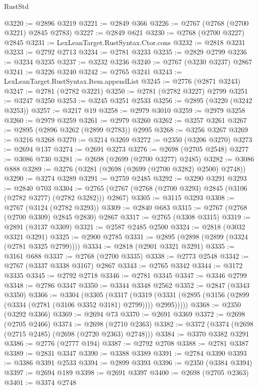 \begin{lexlean}{RustStd}
\begin{coremodule}
@3220 := @2896 @3219
@3221 := @2849 @366
@3226 := @2767 (@2768 (@2700 @3221) @2845 @2783)
@3227 := @2849 @621
@3230 := @2768 (@2700 @3227) @2845
@3231 := LexLeanTarget.RustSyntax.Ctor.cons
@3232 := @2818 @3231
@3233 := @2792 @2713
@3234 := @2781 @3233
@3235 := @2829 @2799
@3236 := @3234 @3235
@3237 := @3232 @3236
@3240 := @2767 (@3230 @3237) @2867
@3241 := @3226 @3240
@3242 := @2765 @3241
@3243 := LexLeanTarget.RustSyntax.Item.appendList
@3245 := @2776 (@2871 @3243)
@3247 := @2781 (@2782 @3221)
@3250 := @2781 (@2782 @3227) @2799
@3251 := @3247 @3250
@3253 := @3245 @3251 @2533
@3256 := @2895 (@3220 (@3242 @3253))
@3257 := @3217 @19
@3258 := @2979 @3010
@3259 := @2979 @3258
@3260 := @2979 @3259
@3261 := @2979 @3260
@3262 := @3257 @3261
@3267 := @2895 (@2896 @3262 (@2899 @2783)) @2995
@3268 := @3256 @3267
@3269 := @3216 @3268
@3270 := @3214 @3269
@3272 := @2350 (@3206 @3270)
@3273 := @2694 @137
@3274 := @2691 @3273
@3276 := @2698 (@2705 @2548)
@3277 := @3086 @730
@3281 := @2698 (@2699 (@2700 @3277) @2485)
@3282 := @3086 @888
@3289 := @3276 (@3281 (@2698 (@2699 (@2700 @3282) @2500) @2748))
@3290 := @3274 @3289
@3291 := @2759 @2485
@3292 := @3290 @3291
@3293 := @2840 @703
@3304 := @2765 (@2767 (@2768 (@2700 @3293) @2845 (@3106 (@2782 @3277) (@2782 @3282))) @2867)
@3305 := @3115 @3293
@3308 := @2767 (@3124 (@2782 @3293))
@3309 := @2840 @683
@3315 := @2767 (@2768 (@2700 @3309) @2845 @2830) @2867
@3317 := @2765 (@3308 @3315)
@3319 := @2891 (@3137 @3309)
@3321 := @2587 @2485 @2500
@3324 := @2818 (@3032 @3321 @3291)
@3325 := @2900 @2785
@3331 := @2895 (@2898 (@2899 (@3324 (@2781 @3325 @2799))))
@3334 := @2818 (@2901 @3321 @3291)
@3335 := @3161 @688
@3337 := @2768 (@2700 @3335)
@3338 := @2773 @2548
@3342 := @2767 (@3337 @3338 @3167) @2867
@3343 := @2765 @3342
@3344 := @3172 @3335
@3345 := @2792 @2718
@3346 := @2781 @3345
@3347 := @3346 @2799
@3348 := @2786 @3347
@3350 := @3344 @3348 @2562
@3352 := @2847 (@3343 @3350)
@3366 := @3304
    (@3305
      (@3317
        (@3319 (@3331 (@2895 (@3156 (@2899 (@3334 (@2781 (@3106 @3352 @3181) @2799)))) @2995)))))
@3368 := @2350 (@3292 @3366)
@3369 := @2694 @73
@3370 := @2691 @3369
@3372 := @2698 (@2705 @2466)
@3374 := @2698 (@2710 @2363)
@3382 := @3372 (@3374 (@2698 (@2715 @2485) (@2698 (@2720 @2363) @2748)))
@3384 := @3370 @3382 @3291
@3386 := @2776 (@2777 @194)
@3387 := @2792 @2708
@3388 := @2781 @3387
@3389 := @2831 @3347
@3390 := @3388 @3389
@3391 := @2784 @3390
@3393 := @3386 @3391 @2533
@3394 := @2899 @3393
@3396 := @2350 (@3384 @3394)
@3397 := @2694 @189
@3398 := @2691 @3397
@3400 := @2698 (@2705 @2363)
@3401 := @3374 @2748

\end{coremodule}
\end{lexlean}
